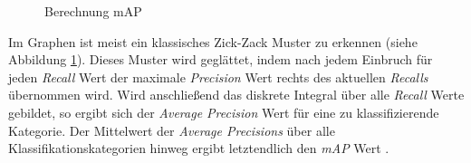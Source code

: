 \begin{figure}[ht]
	\caption[Berechnung mAP]{Berechnung mAP \cite{JonathanHui.20180307}} 
	\label{map}
\end{figure} 

Im Graphen ist meist ein klassisches \glqq Zick-Zack\grqq{} Muster zu erkennen (siehe Abbildung \ref{map}). Dieses Muster wird geglättet, indem nach jedem Einbruch für jeden \textit{Recall} Wert der maximale \textit{Precision} Wert rechts des aktuellen \textit{Recalls} übernommen wird. Wird anschließend das diskrete Integral über alle \textit{Recall} Werte gebildet, so ergibt sich der \textit{Average Precision} Wert für eine zu klassifizierende Kategorie. Der Mittelwert der  \textit{Average Precisions} über alle Klassifikationskategorien hinweg ergibt letztendlich den \textit{mAP} Wert \cite{JonathanHui.20180307}. 

